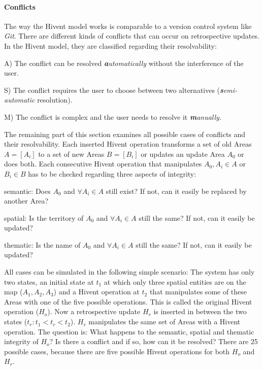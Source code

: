 \paragraph{Conflicts} %
\label{par:conflicts}

The way the Hivent model works is comparable to a version control system like \emph{Git}. There are different kinds of conflicts that can occur on retrospective updates. In the Hivent model, they are classified regarding their resolvability:

\begin{compactitem}
  \item[A)] The conflict can be resolved \emph{\textbf{a}utomatically} without the interference of the user.
  \item[S)] The conflict requires the user to choose between two alternatives (\emph{\textbf{s}emi-automatic} resolution).
  \item[M)] The conflict is complex and the user needs to resolve it \emph{\textbf{m}anually}.
\end{compactitem}

The remaining part of this section examines all possible cases of conflicts and their resolvability. Each inserted Hivent operation transforms a set of old Areas $A = [A_i]$ to a set of new Areas $B = [B_i]$ or updates an update Area $A_0$ or does both. Each consecutive Hivent operation that manipulates $A_0, A_i \in A$ or $B_i \in B$ has to be checked regarding three aspects of integrity:

\begin{compactenum}
  \item semantic: Does $A_0$ and $\forall A_i \in A$ still exist? If not, can it easily be replaced by another Area?
  \item spatial: Is the territory of $A_0$ and $\forall A_i \in A$ still the same? If not, can it easily be updated?
  \item thematic: Is the name of $A_0$ and $\forall A_i \in A$ still the same? If not, can it easily be updated?
\end{compactenum}

All cases can be simulated in the following simple scenario:
The system has only two states, an initial state at $t_1$ at which only three spatial entities are on the map ($A_1, A_2, A_3$) and a Hivent operation at $t_2$ that manipulates some of these Areas with one of the five possible operations. This is called the original Hivent operation ($H_o$). Now a retrospective update $H_r$ is inserted in between the two states ($t_r: t_1 < t_r < t_2$). $H_r$ manipulates the same set of Areas with a Hivent operation. The question is: What happens to the semantic, spatial and thematic integrity of $H_o$? Is there a conflict and if so, how can it be resolved? There are 25 possible cases, because there are five possible Hivent operations for both $H_o$ and $H_r$.

